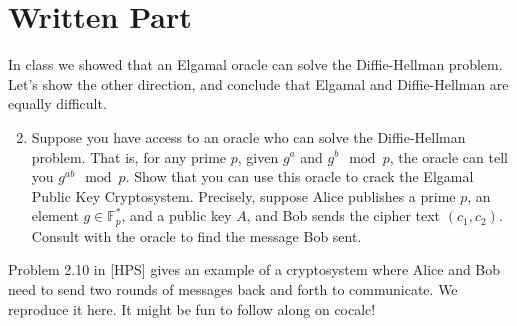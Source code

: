 \documentclass[11pt]{article}
\newcommand{\bF}{\mathbb{F}}
\begin{document}
\section*{Written Part}
In class we showed that an Elgamal oracle can solve the Diffie-Hellman problem.  Let's show the other direction, and conclude that Elgamal and Diffie-Hellman are equally difficult.
\begin{enumerate}
  \setcounter{enumi}{1}
  \item{
  Suppose you have access to an oracle who can solve the Diffie-Hellman problem.  That is, for any prime $p$, given $g^a$ and $g^b\mod p$, the oracle can tell you $g^{ab}\mod p$.  Show that you can use this oracle to crack the Elgamal Public Key Cryptosystem.  Precisely, suppose Alice publishes a prime $p$, an element $g\in\bF_p^*$, and a public key $A$, and Bob sends the cipher text $(c_1,c_2)$.  Consult with the oracle to find the message Bob sent.
  }
\end{enumerate}
Problem 2.10 in [HPS] gives an example of a cryptosystem where Alice and Bob need to send two rounds of messages back and forth to communicate.  We reproduce it here.  It might be fun to follow along on cocalc!
\end{document}
